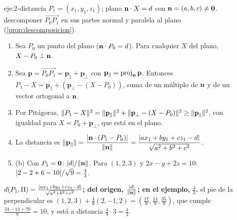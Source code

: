 \begin{solucion}{eje:2-distancia}
\datos $P_1=(x_1,y_1,z_1)$; plano $\mathbf{n}\cdot X=d$ con $\mathbf{n}=(a,b,c)\neq\mathbf{0}$.
\planteamiento descomponer $\overrightarrow{P_0P_1}$ en sus partes normal y paralela al plano (\cref{prop:descomposicion}).
\pasos
\begin{enumerate}[label=\arabic*.]
  \item Sea $P_0$ un punto del plano ($\mathbf{n}\cdot P_0=d$). Para cualquier $X$ del plano, $X-P_0\perp\mathbf{n}$.
  \item Sea $\mathbf p=\overrightarrow{P_0P_1}=\mathbf p_\parallel+\mathbf p_\perp$ con $\mathbf p_\parallel=\operatorname{proj}_{\mathbf{n}}\mathbf p$. Entonces $P_1-X=\mathbf p_\parallel+(\mathbf p_\perp-(X-P_0))$, suma de un múltiplo de $\mathbf{n}$ y de un vector ortogonal a $\mathbf{n}$.
  \item Por Pitágoras, $\lVert P_1-X\rVert^2=\lVert\mathbf p_\parallel\rVert^2+\lVert\mathbf p_\perp-(X-P_0)\rVert^2\ge\lVert\mathbf p_\parallel\rVert^2$, con igualdad para $X=P_0+\mathbf p_\perp$, que está en el plano.
  \item La distancia es $\lVert\mathbf p_\parallel\rVert=\dfrac{\lvert\mathbf{n}\cdot(P_1-P_0)\rvert}{\lVert\mathbf{n}\rVert}=\dfrac{\lvert ax_1+by_1+cz_1-d\rvert}{\sqrt{a^2+b^2+c^2}}$.
  \item (b) Con $P_1=\mathbf{0}$: $\lvert d\rvert/\lVert\mathbf{n}\rVert$. Para $(1,2,3)$ y $2x-y+2z=10$: $\lvert2-2+6-10\rvert/\sqrt{9}=\frac43$.
\end{enumerate}
\resultado \textbf{$d(P_1,\Pi)=\frac{\lvert ax_1+by_1+cz_1-d\rvert}{\sqrt{a^2+b^2+c^2}}$; del origen, $\frac{\lvert d\rvert}{\lVert\mathbf{n}\rVert}$; en el ejemplo, $\frac43$.}
\comprobacion el pie de la perpendicular es $(1,2,3)+\frac49(2,-1,2)=(\frac{17}9,\frac{14}9,\frac{35}9)$, que cumple $\frac{34-14+70}{9}=10$, y está a distancia $\frac49\cdot3=\frac43$.
\end{solucion}

